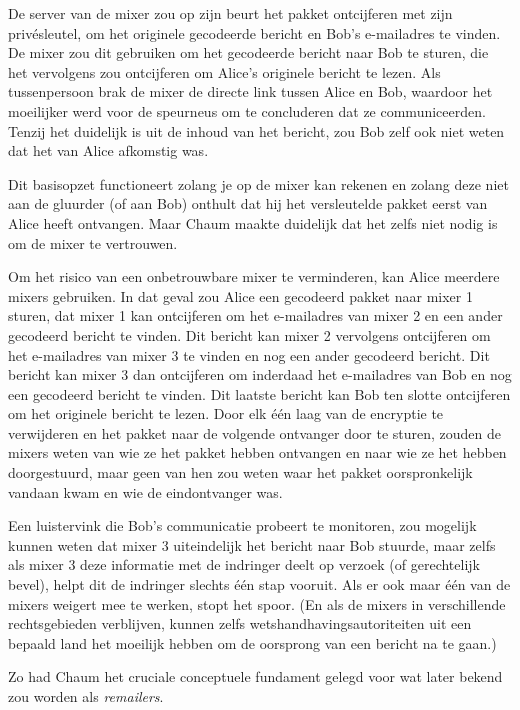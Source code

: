 \documentclass[smalldemyvopaper,11pt,twoside,onecolumn,openright,extrafontsizes,hidelinks]{memoir}
\begin{document}
De server van de mixer zou op zijn beurt het pakket ontcijferen met zijn
privésleutel, om het originele gecodeerde bericht en Bob's e-mailadres
te vinden. De mixer zou dit gebruiken om het gecodeerde bericht naar Bob
te sturen, die het vervolgens zou ontcijferen om Alice's originele
bericht te lezen. Als tussenpersoon brak de mixer de directe link tussen
Alice en Bob, waardoor het moeilijker werd voor de speurneus om te
concluderen dat ze communiceerden. Tenzij het duidelijk is uit de inhoud
van het bericht, zou Bob zelf ook niet weten dat het van Alice afkomstig
was.

Dit basisopzet functioneert zolang je op de mixer kan rekenen en zolang
deze niet aan de gluurder (of aan Bob) onthult dat hij het versleutelde
pakket eerst van Alice heeft ontvangen. Maar Chaum maakte duidelijk dat
het zelfs niet nodig is om de mixer te vertrouwen.

Om het risico van een onbetrouwbare mixer te verminderen, kan Alice
meerdere mixers gebruiken. In dat geval zou Alice een gecodeerd pakket
naar mixer 1 sturen, dat mixer 1 kan ontcijferen om het e-mailadres van
mixer 2 en een ander gecodeerd bericht te vinden. Dit bericht kan mixer
2 vervolgens ontcijferen om het e-mailadres van mixer 3 te vinden en nog
een ander gecodeerd bericht. Dit bericht kan mixer 3 dan ontcijferen om
inderdaad het e-mailadres van Bob en nog een gecodeerd bericht te
vinden. Dit laatste bericht kan Bob ten slotte ontcijferen om het
originele bericht te lezen. Door elk één laag van de encryptie te
verwijderen en het pakket naar de volgende ontvanger door te sturen,
zouden de mixers weten van wie ze het pakket hebben ontvangen en naar
wie ze het hebben doorgestuurd, maar geen van hen zou weten waar het
pakket oorspronkelijk vandaan kwam en wie de eindontvanger was.

Een luistervink die Bob's communicatie probeert te monitoren, zou
mogelijk kunnen weten dat mixer 3 uiteindelijk het bericht naar Bob
stuurde, maar zelfs als mixer 3 deze informatie met de indringer deelt
op verzoek (of gerechtelijk bevel), helpt dit de indringer slechts één
stap vooruit. Als er ook maar één van de mixers weigert mee te werken,
stopt het spoor. (En als de mixers in verschillende rechtsgebieden
verblijven, kunnen zelfs wetshandhavingsautoriteiten uit een bepaald
land het moeilijk hebben om de oorsprong van een bericht na te gaan.)

Zo had Chaum het cruciale conceptuele fundament gelegd voor wat later
bekend zou worden als \emph{remailers}.
\end{document}
